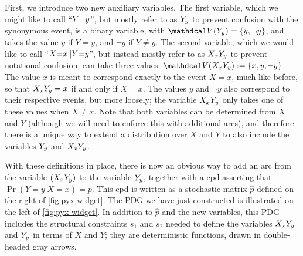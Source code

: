 First, we introduce two new auxiliary variables.
The first variable, which we might like to call ``${Y{=}y}$'', but
    mostly refer to as ${Y_y}$ to prevent confusion with the synonymous
    event, is a binary variable, with $\V(\Yyshort) = \{y, \lnot y\}$,
    and takes the value $y$ if $Y=y$, and $\lnot y$ if $Y \ne y$.
The second variable, which we would like to call ``${X{=}x\Vert Y{=}y}$'',
    but instead mostly refer to as ${X_x Y_y}$ to prevent notational confusion,
    can take three values: $\V(\XxYyshort):= \{ x, y, \lnot y \}$.
The value $x$ is meant to correspond exactly to the event $X{=}x$,
    much like before, so that ${X_x Y_y} = x$ if and only if $X = x$.
The values $y$ and $\lnot y$ also correspond to their respective
    events, but more loosely; the variable ${X_x Y_y}$ only takes one of these
    values when $X \ne x$.
Note that both variables can be determined from $X$ and $Y$
(although we will need to enforce this with additional arcs), and
therefore there is a unique way to extend a
distribution over $X$ and $Y$ to also include the variables ${Y_y}$ and ${X_x Y_y}$.

With these definitions in place, there is
    now an obvious way to add an arc from the variable $({X_x Y_y})$
    to the variable ${Y_y}$, together with a cpd asserting that $\Pr(Y{=}y|X{=}x)=p$.
This cpd is written as a stochastic matrix $\hat p$
    defined on the right of \cref{fig:pyx-widget}.
The PDG we have just constructed is illustrated on the left of \cref{fig:pyx-widget}.
In addition to $\hat p$ and the new variables, this PDG
    includes the structural constraints $s_1$ and $s_2$ needed to define the variables
    ${X_x Y_y}$ and ${Y_y}$ in terms of $X$ and $Y$; they are deterministic functions,
    drawn in double-headed gray arrows.

